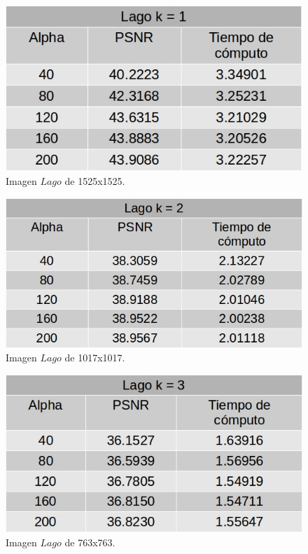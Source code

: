 \documentclass[a4paper]{article}
\begin{document}
           \begin{figure}[H]
    \centering
    \includegraphics[scale=0.4]{imagenes/lago1.jpg}
    \caption{Imagen $Lago$ de 1525x1525.}
	\label{lagoe}
    \end{figure}
    
        \begin{figure}[H]
    \centering
    \includegraphics[scale=0.4]{imagenes/lago2.jpg}
    \caption{Imagen $Lago$ de 1017x1017.}
	\label{lagoe}
    \end{figure}
    
        \begin{figure}[H]
    \centering
    \includegraphics[scale=0.4]{imagenes/lago3.jpg}
    \caption{Imagen $Lago$ de 763x763.}
	\label{lagoe}
    \end{figure}
    
\end{document}
